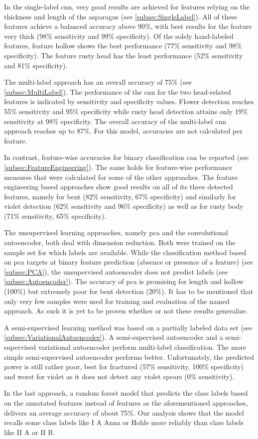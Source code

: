 \bigskip
In the single-label \acrshort{cnn}, very good results are achieved for features relying on the thickness and length of the asparagus (see \autoref{subsec:SingleLabel}). All of these features achieve a balanced accuracy above 90\%, with best results for the feature very thick (98\% sensitivity and 99\% specificity). Of the solely hand-labeled features, feature hollow shows the best performance (77\% sensitivity and 98\% specificity). The feature rusty head has the least performance (52\% sensitivity and 81\% specificity).

The multi-label approach has an overall accuracy of 75\% (see \autoref{subsec:MultiLabel}). The performance of the  \acrshort{cnn} for the two head-related features is indicated by sensitivity and specificity values. Flower detection reaches 55\% sensitivity and 95\% specificity while rusty head detection attains only 19\% sensitivity at 98\% specificity. The overall accuracy of the multi-label \acrshort{cnn} approach reaches up to 87\%. For this model, accuracies are not calculated per feature.

In contrast, feature-wise accuracies for binary classification can be reported (see \autoref{subsec:FeatureEngineering}). The same holds for feature-wise performance measures that were calculated for some of the other approaches. The feature engineering based approaches show good results on all of its three detected features, namely for bent (82\% sensitivity, 67\% specificity) and similarly for violet detection (62\% sensitivity and 96\% specificity) as well as for rusty body (71\% sensitivity, 65\% specificity).

\bigskip
The unsupervised learning approaches, namely \acrshort{pca} and the convolutional autoencoder, both deal with dimension reduction. Both were trained on the sample set for which labels are available. While the classification method based on \acrshort{pca} targets at binary feature prediction (absence or presence of a feature) (see \autoref{subsec:PCA}), the unsupervised autoencoder does not predict labels (see \autoref{subsec:Autoencoder}). The accuracy of \acrshort{pca} is promising for length and hollow (100\%) but extremely poor for bent detection (20\%). It has to be mentioned that only very few samples were used for training and evaluation of the named approach. As such it is yet to be proven whether or not these results generalize.

\bigskip
A semi-supervised learning method was based on a partially labeled data set (see \autoref{subsec:VariationalAutoencoder}). A semi-supervised autoencoder and a semi-supervised variational autoencoder perform multi-label classification. The more simple semi-supervised autoencoder performs better. Unfortunately, the predicted power is still rather poor, best for fractured (57\% sensitivity, 100\% specificity) and worst for violet as it does not detect any violet spears (0\% sensitivity).

\bigskip
In the last approach, a random forest model that predicts the class labels based on the annotated features instead of features as the aforementioned approaches, delivers an average accuracy of about 75\%. Our analysis shows that the model recalls some class labels like I A Anna or Hohle more reliably than class labels like II A or II B.